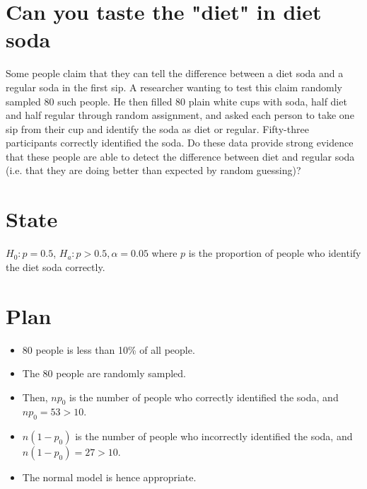 \documentclass{scrreprt} %
\begin{document}
\section{Can you taste the "diet" in diet soda}

Some people claim that they can tell the difference between a diet soda and a regular soda in the
first sip. A researcher wanting to test this claim randomly sampled 80 such people. He then filled
80 plain white cups with soda, half diet and half regular through random assignment, and asked
each person to take one sip from their cup and identify the soda as diet or regular. Fifty-three
participants correctly identified the soda. Do these data provide strong evidence that these people
are able to detect the difference between diet and regular soda (i.e. that they are doing better
than expected by random guessing)?

\newpage

\section{State}


$H_0: p = 0.5$, $H_a: p > 0.5, \alpha = 0.05$
where $p$ is the proportion of people who identify the diet soda correctly.

\newpage

\section{Plan}

\begin{itemize}
	\item 80 people is less than 10\% of all people.
	\item The 80 people are randomly sampled.
	\item Then, $np_0$ is the number of people who correctly identified
	the soda, and $np_0 = 53 > 10$.
	\item $n(1-p_0)$ is the number of people who incorrectly identified the
	soda, and $n(1-p_0)= 27 > 10$.
	\item The normal model is hence appropriate.
\end{itemize}

\newpage
\end{document}
